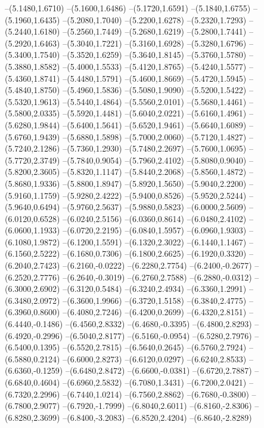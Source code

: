 {\begin{scope}
--(5.1480,1.6710)
--(5.1600,1.6486)
--(5.1720,1.6591)
--(5.1840,1.6755)
--(5.1960,1.6435)
--(5.2080,1.7040)
--(5.2200,1.6278)
--(5.2320,1.7293)
--(5.2440,1.6180)
--(5.2560,1.7449)
--(5.2680,1.6219)
--(5.2800,1.7441)
--(5.2920,1.6463)
--(5.3040,1.7221)
--(5.3160,1.6928)
--(5.3280,1.6796)
--(5.3400,1.7540)
--(5.3520,1.6259)
--(5.3640,1.8145)
--(5.3760,1.5780)
--(5.3880,1.8582)
--(5.4000,1.5533)
--(5.4120,1.8765)
--(5.4240,1.5577)
--(5.4360,1.8741)
--(5.4480,1.5791)
--(5.4600,1.8669)
--(5.4720,1.5945)
--(5.4840,1.8750)
--(5.4960,1.5836)
--(5.5080,1.9090)
--(5.5200,1.5422)
--(5.5320,1.9613)
--(5.5440,1.4864)
--(5.5560,2.0101)
--(5.5680,1.4461)
--(5.5800,2.0335)
--(5.5920,1.4481)
--(5.6040,2.0221)
--(5.6160,1.4961)
--(5.6280,1.9844)
--(5.6400,1.5641)
--(5.6520,1.9461)
--(5.6640,1.6089)
--(5.6760,1.9439)
--(5.6880,1.5898)
--(5.7000,2.0060)
--(5.7120,1.4827)
--(5.7240,2.1286)
--(5.7360,1.2930)
--(5.7480,2.2697)
--(5.7600,1.0695)
--(5.7720,2.3749)
--(5.7840,0.9054)
--(5.7960,2.4102)
--(5.8080,0.9040)
--(5.8200,2.3605)
--(5.8320,1.1147)
--(5.8440,2.2068)
--(5.8560,1.4872)
--(5.8680,1.9336)
--(5.8800,1.8947)
--(5.8920,1.5650)
--(5.9040,2.2200)
--(5.9160,1.1759)
--(5.9280,2.4222)
--(5.9400,0.8526)
--(5.9520,2.5244)
--(5.9640,0.6494)
--(5.9760,2.5637)
--(5.9880,0.5823)
--(6.0000,2.5609)
--(6.0120,0.6528)
--(6.0240,2.5156)
--(6.0360,0.8614)
--(6.0480,2.4102)
--(6.0600,1.1933)
--(6.0720,2.2195)
--(6.0840,1.5957)
--(6.0960,1.9303)
--(6.1080,1.9872)
--(6.1200,1.5591)
--(6.1320,2.3022)
--(6.1440,1.1467)
--(6.1560,2.5222)
--(6.1680,0.7306)
--(6.1800,2.6625)
--(6.1920,0.3320)
--(6.2040,2.7423)
--(6.2160,-0.0222)
--(6.2280,2.7754)
--(6.2400,-0.2677)
--(6.2520,2.7776)
--(6.2640,-0.3019)
--(6.2760,2.7588)
--(6.2880,-0.0312)
--(6.3000,2.6902)
--(6.3120,0.5484)
--(6.3240,2.4934)
--(6.3360,1.2991)
--(6.3480,2.0972)
--(6.3600,1.9966)
--(6.3720,1.5158)
--(6.3840,2.4775)
--(6.3960,0.8600)
--(6.4080,2.7246)
--(6.4200,0.2699)
--(6.4320,2.8151)
--(6.4440,-0.1486)
--(6.4560,2.8332)
--(6.4680,-0.3395)
--(6.4800,2.8293)
--(6.4920,-0.2996)
--(6.5040,2.8177)
--(6.5160,-0.0954)
--(6.5280,2.7976)
--(6.5400,0.1395)
--(6.5520,2.7815)
--(6.5640,0.2645)
--(6.5760,2.7924)
--(6.5880,0.2124)
--(6.6000,2.8273)
--(6.6120,0.0297)
--(6.6240,2.8533)
--(6.6360,-0.1259)
--(6.6480,2.8472)
--(6.6600,-0.0381)
--(6.6720,2.7887)
--(6.6840,0.4604)
--(6.6960,2.5832)
--(6.7080,1.3431)
--(6.7200,2.0421)
--(6.7320,2.2996)
--(6.7440,1.0214)
--(6.7560,2.8862)
--(6.7680,-0.3800)
--(6.7800,2.9077)
--(6.7920,-1.7999)
--(6.8040,2.6011)
--(6.8160,-2.8306)
--(6.8280,2.3699)
--(6.8400,-3.2083)
--(6.8520,2.4204)
--(6.8640,-2.8289)

\end{scope}}
